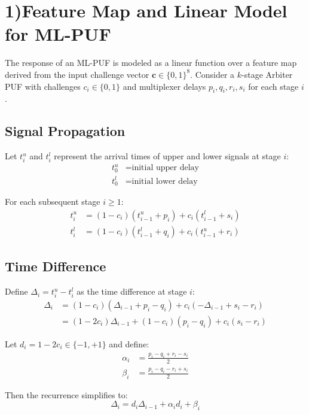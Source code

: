 \documentclass[11pt]{article}
\begin{document}
\section{1)Feature Map and Linear Model for ML-PUF}

The response of an ML-PUF is modeled as a linear function over a feature map derived from the input challenge vector $\textbf{c} \in \{0,1\}^8$. Consider a $k$-stage Arbiter PUF with challenges $c_i \in \{0,1\}$ and multiplexer delays $p_i, q_i, r_i, s_i$ for each stage $i$.

\subsection{Signal Propagation}

Let $t_i^u$ and $t_i^l$ represent the arrival times of upper and lower signals at stage $i$:
\begin{align*}
t_0^u &= \text{initial upper delay} \\
t_0^l &= \text{initial lower delay}
\end{align*}

For each subsequent stage $i \geq 1$:
\begin{align*}
t_i^u &= (1-c_i)(t_{i-1}^u + p_i) + c_i(t_{i-1}^l + s_i) \\
t_i^l &= (1-c_i)(t_{i-1}^l + q_i) + c_i(t_{i-1}^u + r_i)
\end{align*}

\subsection{Time Difference}

Define $\Delta_i = t_i^u - t_i^l$ as the time difference at stage $i$:
\begin{align*}
\Delta_i &= (1-c_i)(\Delta_{i-1} + p_i - q_i) + c_i(-\Delta_{i-1} + s_i - r_i) \\
&= (1-2c_i)\Delta_{i-1} + (1-c_i)(p_i - q_i) + c_i(s_i - r_i)
\end{align*}

Let $d_i = 1 - 2c_i \in \{-1,+1\}$ and define:
\begin{align*}
\alpha_i &= \frac{p_i - q_i + r_i - s_i}{2} \\
\beta_i &= \frac{p_i - q_i - r_i + s_i}{2}
\end{align*}

Then the recurrence simplifies to:
\begin{equation*}
\Delta_i = d_i\Delta_{i-1} + \alpha_i d_i + \beta_i
\end{equation*}
\end{document}
